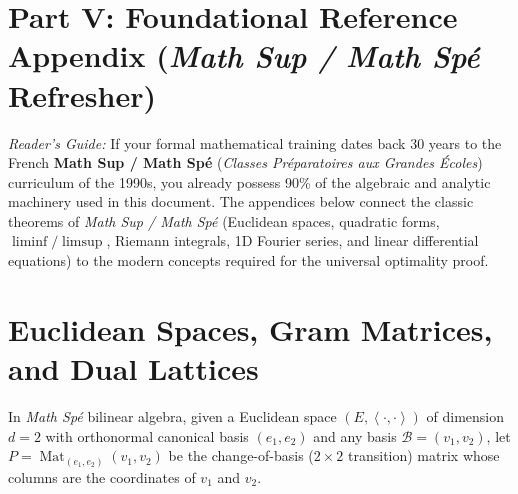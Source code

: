 \documentclass[11pt, a4paper]{article}
\theoremstyle{definition}
\theoremstyle{remark}
\newcommand{\inner}[2]{\left\langle #1, #2 \right\rangle}
\begin{document}
\newpage
\appendix
\section*{Part V: Foundational Reference Appendix (\textit{Math Sup / Math Sp\'e} Refresher)}

\noindent \textit{Reader's Guide:} If your formal mathematical training dates back 30 years to the French \textbf{Math Sup / Math Sp\'e} (\textit{Classes Pr\'eparatoires aux Grandes \'Ecoles}) curriculum of the 1990s, you already possess 90\% of the algebraic and analytic machinery used in this document. The appendices below connect the classic theorems of \textit{Math Sup / Math Sp\'e} (Euclidean spaces, quadratic forms, $\liminf/\limsup$, Riemann integrals, 1D Fourier series, and linear differential equations) to the modern concepts required for the universal optimality proof.

\section{Euclidean Spaces, Gram Matrices, and Dual Lattices}
\label{app:gram}

In \textit{Math Sp\'e} bilinear algebra, given a Euclidean space $(E, \inner{\cdot}{\cdot})$ of dimension $d = 2$ with orthonormal canonical basis $(e_1, e_2)$ and any basis $\mathcal{B} = (v_1, v_2)$, let $P = \operatorname{Mat}_{(e_1, e_2)}(v_1, v_2)$ be the change-of-basis ($2 \times 2$ transition) matrix whose columns are the coordinates of $v_1$ and $v_2$.
\end{document}
